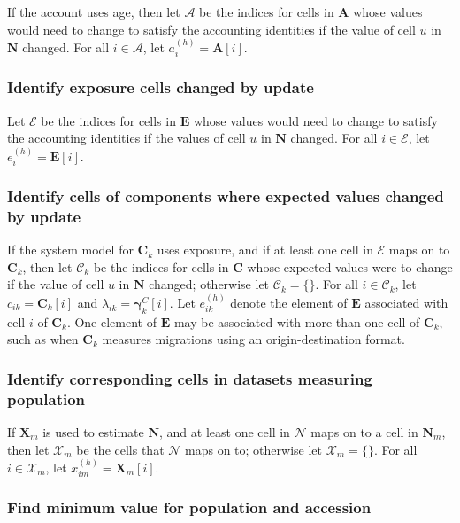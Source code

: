 \documentclass{article}
\begin{document}
If the account uses age, then let $\mathcal{A}$ be the indices for cells in $\bm{A}$ whose values would need to change to satisfy the accounting identities if the value of cell $u$ in $\bm{N}$ changed.  For all $i \in \mathcal{A}$, let $a_i^{(h)} = \bm{A}[i]$.

\subsubsection{Identify exposure cells changed by update}

Let $\mathcal{E}$ be the indices for cells in $\bm{E}$ whose values would need to change to satisfy the accounting identities if the values of cell $u$ in $\bm{N}$ changed.  For all $i \in \mathcal{E}$, let $e_i^{(h)} = \bm{E}[i]$.

\subsubsection{Identify cells of components where expected values changed by update}

If the system model for $\bm{C}_k$ uses exposure, and if at least one cell in $\mathcal{E}$ maps on to $\bm{C}_k$, then let $\mathcal{C}_k$ be the indices for cells in $\bm{C}$ whose expected values were to change if the value of cell $u$ in $\bm{N}$ changed; otherwise let $\mathcal{C}_k = \{\}$.  For all $i \in \mathcal{C}_k$, let $c_{ik} = \bm{C}_k[i]$ and $\lambda_{ik} = \bm{\gamma}_k^C[i]$.  Let $e_{ik}^{(h)}$ denote the element of $\bm{E}$ associated with cell $i$ of $\bm{C}_k$.  One element of $\bm{E}$ may be associated with more than one cell of $\bm{C}_k$, such as when $\bm{C}_k$ measures migrations using an origin-destination format.

\subsubsection{Identify corresponding cells in datasets measuring population}

If $\bm{X}_m$ is used to estimate $\bm{N}$, and at least one cell in $\mathcal{N}$ maps on to a cell in $\bm{N}_m$, then let $\mathcal{X}_m$ be the cells that $\mathcal{N}$ maps on to; otherwise let $\mathcal{X}_m = \{\}$. For all $i \in \mathcal{X}_m$, let $x_{im}^{(h)} = \bm{X}_m[i]$.


\subsubsection{Find minimum value for population and accession}
\end{document}
